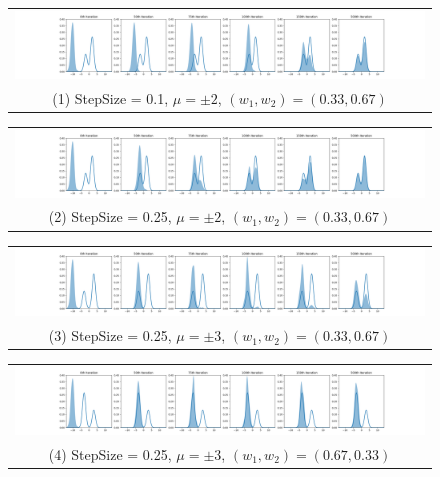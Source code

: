 \begin{figure}[h]
    \centering
    \begin{tabular}{@{}c@{}}
        \includegraphics[width=\textwidth]{figs/toy-figure1_step0.1_mu2.0_w0.33_gaussian.png} \\
        \small (1) StepSize = 0.1, $\mu = \pm 2$, $(w_1, w_2) = (0.33, 0.67)$
    \end{tabular}
    
    \begin{tabular}{@{}c@{}}
        \includegraphics[width=\textwidth]{figs/toy-figure1.png} \\
        \small (2) StepSize = 0.25, $\mu = \pm 2$, $(w_1, w_2) = (0.33, 0.67)$
    \end{tabular}
    
    \begin{tabular}{@{}c@{}}
        \includegraphics[width=\textwidth]{figs/toy-figure1_step0.25_mu3.0_w0.33_gaussian.png} \\
        \small (3) StepSize = 0.25, $\mu = \pm 3$, $(w_1, w_2) = (0.33, 0.67)$
    \end{tabular}
    
    \begin{tabular}{@{}c@{}}
        \includegraphics[width=\textwidth]{figs/toy-figure1_step0.25_mu3.0_w0.67_gaussian.png} \\
        \small (4) StepSize = 0.25, $\mu = \pm 3$, $(w_1, w_2) = (0.67, 0.33)$
    \end{tabular}
    

\end{figure}
